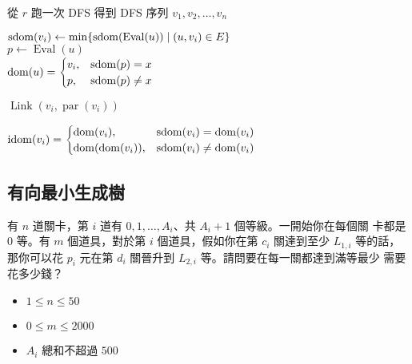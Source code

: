 \documentclass[standalone]{beamer}
\begin{document}
\begin{frame}{}
  \begin{algorithm}[H]

    從 $r$ 跑一次 DFS 得到 DFS 序列 $v_1, v_2, \ldots, v_n$ \\

     {
       {
        $\operatorname{sdom}(v_i) \gets \min\{\operatorname{sdom}(\operatorname{Eval}(u)) \mid (u, v_i) \in E\}$ \\

         {
           {
            $p \gets \operatorname{Eval}(u)$ \\
            $\operatorname{dom}(u) =
              \begin{cases}
                v_i, & \operatorname{sdom}(p) = x \\
                p, & \operatorname{sdom}(p) \neq x \\
              \end{cases}$ \\
          }
        }

         {
          $\operatorname{Link}(v_i, \operatorname{par}(v_i))$
        }
      }
    }

     {
       {
        $\operatorname{idom}(v_i) =
          \begin{cases}
            \operatorname{dom}(v_i), & \operatorname{sdom}(v_i) = \operatorname{dom}(v_i) \\
            \operatorname{dom}(\operatorname{dom}(v_i)), & \operatorname{sdom}(v_i) \neq \operatorname{dom}(v_i) \\
          \end{cases}$
      }
    }
  \end{algorithm}
\end{frame}

\subsection{有向最小生成樹}

\begin{frame}{}
  \begin{problem}
    有 $n$ 道關卡，第 $i$ 道有 $0, 1, \ldots, A_i$、共 $A_i + 1$ 個等級。一開始你在每個關
    卡都是 $0$ 等。有 $m$ 個道具，對於第 $i$ 個道具，假如你在第 $c_i$ 關達到至少 $L_{1,i}$
    等的話，那你可以花 $p_i$ 元在第 $d_i$ 關晉升到 $L_{2,i}$ 等。請問要在每一關都達到滿等最少
    需要花多少錢？

    \begin{itemize}
      \item $1 \leq n \leq 50$
      \item $0 \leq m \leq 2000$
      \item $A_i$ 總和不超過 $500$
    \end{itemize}
  \end{problem}
\end{frame}
\end{document}
